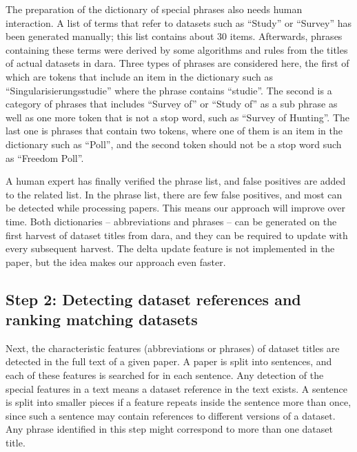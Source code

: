 \documentclass{IOS-Book-Article}
\newcommand{\dara}{\textsf{da\textbar ra}}
\begin{document}
The preparation of the dictionary of special phrases also needs human interaction. A list of terms that refer to datasets such as \enquote{Study} or \enquote{Survey} has been generated manually; this list contains about 30 items. Afterwards, phrases containing these terms were derived by some algorithms and rules from the titles of actual datasets in {\dara}. Three types of phrases are considered here, the first of which are tokens that include an item in the dictionary such as \enquote{Singularisierungsstudie} where the phrase contains \enquote{studie}.
The second is a category of phrases that includes \enquote{Survey of} or \enquote{Study of} as a sub phrase as well as one more token that is not a stop word, such as \enquote{Survey of Hunting}. The last one is phrases that contain two tokens, where one of them is an item in the dictionary such as \enquote{Poll}, and the second token should not be a stop word such as \enquote{Freedom Poll}. 

A human expert has finally verified the phrase list, and false positives are added to the related list. In the phrase list, there are few false positives, and most can be detected while processing papers. This means our approach will improve over time.
Both dictionaries -- abbreviations and phrases -- can be generated on the first harvest of dataset titles from {\dara}, and they can be required to update with every subsequent harvest. The delta update feature is not implemented in the paper, but the idea makes our approach even faster.
 
\subsection{Step 2: Detecting dataset references and ranking matching datasets}
\label{sec:detecting-ranking}
Next, the characteristic features (abbreviations or phrases) of dataset titles are detected in the full text of a given paper. A paper is split into sentences, and each of these features is searched for in each sentence. Any detection of the special features in a text means a dataset reference in the text exists.
A sentence is split into smaller pieces if a feature repeats inside the sentence more than once, since such a sentence may contain references to different versions of a dataset. Any phrase identified in this step might correspond to more than one dataset title.
\end{document}
